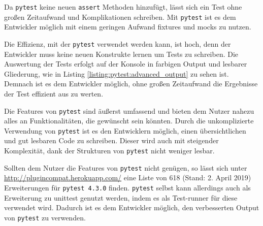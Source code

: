Da \lstinline{pytest} keine neuen \lstinline{assert} Methoden hinzufügt, lässt
sich ein Test ohne großen Zeitaufwand und Komplikationen schreiben. Mit
\lstinline{pytest} ist es dem Entwickler möglich mit einem geringen Aufwand
\Glspl{fixture} und \Glspl{mock} zu nutzen.

Die Effizienz, mit der \lstinline{pytest} verwendet werden kann, ist hoch, denn
der Entwickler muss keine neuen Konstrukte lernen um Tests zu schreiben. Die
Auswertung der Tests erfolgt auf der Konsole in farbigen Output und lesbarer
Gliederung, wie in Listing \ref{listing:pytest:advanced_output} zu sehen ist.
Demnach ist es dem Entwickler möglich, ohne großen Zeitaufwand die Ergebnisse
der Test effizient aus zu werten.

Die Features von \lstinline{pytest} sind äußerst umfassend und bieten dem Nutzer
nahezu alles an Funktionalitäten, die gewünscht sein könnten. Durch die
unkomplizierte Verwendung von \lstinline{pytest} ist es den Entwicklern möglich,
einen übersichtlichen und gut lesbaren Code zu schreiben. Dieser wird auch mit
steigender Komplexität, dank der Strukturen von \lstinline{pytest} nicht weniger
lesbar.

Sollten dem Nutzer die Features von \lstinline{pytest} nicht genügen, so lässt
sich unter \url{http://plugincompat.herokuapp.com/} eine Liste von 618 (Stand:
2. April 2019) Erweiterungen für \lstinline{pytest 4.3.0} finden.
\lstinline{pytest} selbst kann allerdings auch als Erweiterung zu unittest
genutzt werden, indem es als Test-runner für diese verwendet wird. Dadurch ist
es dem Entwickler möglich, den verbesserten Output von \lstinline{pytest} zu
verwenden.